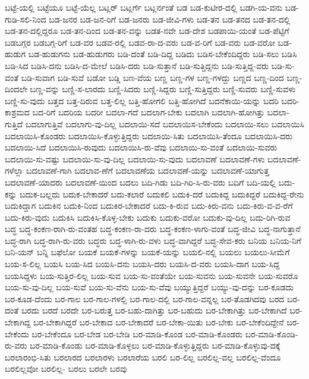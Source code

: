 {ಬಟ್ಟೆ-ಯಲ್ಲಿ
ಬಟ್ಟೆಯೂ
ಬಟ್ಟೆ-ಯೆಲ್ಲ
ಬಟ್ಲರ್
ಬಟ್ಲರ್ಗೆ
ಬಟ್ಲರ್ನಂತೆ
ಬಡ
ಬಡ-ಕುಟೀರ-ದಲ್ಲಿ
ಬಡಗಿ-ಯ-ವನು
ಬಡ-ಗುಡಿ-ಸಲಿ-ನಿಂದ
ಬಡ-ಜನರ
ಬಡ-ಜನ-ರಿಗೆ
ಬಡ-ಜನರು
ಬಡ-ಜೀವಿ-ಗಳು
ಬಡ-ತನ
ಬಡ-ತನದ
ಬಡ-ತನ-ದಲ್ಲಿ
ಬಡ-ತನ-ದಲ್ಲಿದ್ದರೂ
ಬಡ-ತನ-ದಿಂದ
ಬಡ-ತನ-ವನ್ನು
ಬಡತ-ನವೇ
ಬಡ-ದೇಶ
ಬಡಪಾಯಿ-ಯಂತೆ
ಬಡ-ಪೆಟ್ಟಿಗೆ
ಬಡಬಗ್ಗರ
ಬಡಬಗ್ಗ-ರಿಗೆ
ಬಡ-ವರ
ಬಡವ-ರಲ್ಲಿ
ಬಡವ-ರಾ-ದ-ವರು
ಬಡ-ವ-ರಿಗೆ
ಬಡ-ವರು
ಬಡ-ವರೋ
ಬಡ-ಹುಡುಗ
ಬಡ-ಹುಡುಗನು
ಬಡ-ಹುಡುಗರು
ಬಡಿ-ದಂತೆ
ಬಡಿ-ದಿದ್ದ
ಬಡಿದು
ಬಡಿಸ-ಬೇಕೆಂದಿದ್ದರು
ಬಡಿ-ಸಲು
ಬಡಿಸಿ
ಬಡಿ-ಸಿದ
ಬಡಿಸಿ-ದನು
ಬಡಿಸಿ-ದ-ಮೇಲೆ
ಬಡಿಸಿ-ದರು
ಬಡಿ-ಸುತ್ತಾನೆ
ಬಡಿ-ಸುತ್ತಿದ್ದನು
ಬಡಿ-ಸುತ್ತಿದ್ದ-ವರು
ಬಡಿ-ಸು-ವಂತೆ
ಬಡಿ-ಸುವಾಗ
ಬಡಿ-ಸುವೆ
ಬಡೋ
ಬಡ್ಡಿ
ಬಣ-ವೆಯ
ಬಣ್ಣ
ಬಣ್ಣ-ಗಳ
ಬಣ್ಣ-ಗಳದ್ದು
ಬಣ್ಣದ
ಬಣ್ಣ-ದಿಂದ
ಬಣ್ಣ-ದಿಂದಲೇ
ಬಣ್ಣ-ವನ್ನು
ಬಣ್ಣಿ-ಸ-ಲಾರದು
ಬಣ್ಣಿ-ಸಿದರು
ಬಣ್ಣಿ-ಸಿದ್ದರು
ಬಣ್ಣಿ-ಸುತ್ತಿದ್ದರು
ಬಣ್ಣಿ-ಸುವರು
ಬಣ್ಣಿ-ಸುವಳು
ಬಣ್ಣಿ-ಸು-ವುದು
ಬತ್ತದ
ಬತ್ತ-ದಿರುವ
ಬತ್ತ-ಲಿಲ್ಲ
ಬತ್ತಿ-ಹೋಗಲಿ
ಬತ್ತಿ-ಹೋಗಿದೆ
ಬದನೆಕಾಯಿ-ಯನ್ನು
ಬದರಿ
ಬದರಿ-ಕಾಶ್ರಮದ
ಬದ-ರಿಗೆ
ಬದರಿಯ
ಬದರೀ
ಬದಲಾ-ಗದೆ
ಬದಲಾಗ-ಬೇಕು
ಬದಲಾಗಿ
ಬದಲಾಗಿ-ಹೋಗಿತ್ತು
ಬದಲಾ-ಗುತ್ತಿದೆ
ಬದಲಾಗುತ್ತಿವೆ
ಬದಲಾಗು-ವು-ದಿಲ್ಲ
ಬದಲಾಯಿ-ಸದೆ
ಬದಲಾಯಿಸ-ಬೇಕೆಂದು
ಬದಲಾಯಿ-ಸಲು
ಬದಲಾಯಿಸಿ
ಬದಲಾಯಿಸಿ-ಕೊಂಡರು
ಬದಲಾಯಿಸಿ-ಕೊಳ್ಳುತ್ತಿದ್ದರು
ಬದಲಾಯಿ-ಸಿತು
ಬದಲಾಯಿಸಿ-ತೆಂದೂ
ಬದಲಾಯಿಸಿ-ದರು
ಬದಲಾಯಿ-ಸಿದೆ
ಬದಲಾಯಿಸಿ-ರುವುದು
ಬದಲಾಯಿಸಿ-ರು-ವೆವು
ಬದಲಾಯಿ-ಸು-ವಂತೆ
ಬದಲಾಯಿ-ಸುವರು
ಬದಲಾಯಿ-ಸು-ವಷ್ಟು
ಬದಲಾಯಿ-ಸು-ವು-ದಿಲ್ಲ
ಬದಲಾಯಿ-ಸು-ವುದು
ಬದಲಾವಣೆ
ಬದಲಾವಣೆ-ಗಳು
ಬದಲಾವಣೆ-ಗಳೆಲ್ಲಾ
ಬದಲಾವಣೆ-ಗಾಗಿ
ಬದಲಾವ-ಣೆಗೆ
ಬದಲಾವಣೆಯ
ಬದಲಾವಣೆ-ಯನ್ನು
ಬದಲಾವಣೆ-ಯಾಗುತ್ತ
ಬದಲಾವಣೆ-ಯಾದರು
ಬದಲಾವಣೆ-ಯಿಂದ
ಬದಲು
ಬದಿ-ಗಿಡು
ಬದಿ-ಗಿರಿ-ಸಿ-ರು-ವರು
ಬದಿಗೆ
ಬದಿ-ಯಲ್ಲಿ
ಬದು-ಕನ್ನು
ಬದುಕ-ಬಲ್ಲದು
ಬದುಕ-ಬೇಕಾದರೆ
ಬದು-ಕಲಾರೆ
ಬದುಕಲಿ
ಬದುಕಿ-ದರೆ
ಬದುಕಿದ್ದ
ಬದುಕಿದ್ದರೆ
ಬದುಕಿದ್ದ-ರೇನು
ಬದುಕಿದ್ದಾಗ
ಬದುಕಿನ
ಬದುಕಿ-ನಿಂದ
ಬದುಕಿರ-ಬೇಕಾದರೆ
ಬದು-ಕಿ-ರುವ
ಬದು-ಕಿರು-ವನು
ಬದು-ಕಿರು-ವ-ವ-ರೆಗೆ
ಬದು-ಕಿರು-ವುದು
ಬದುಕಿಸಿ
ಬದುಕಿಸಿ-ಕೊಳ್ಳ-ಬೇಕು
ಬದುಕು
ಬದುಕು-ವರೋ
ಬದುಕು-ವು-ದಿಲ್ಲ
ಬದು-ರಿಗಿ-ರುವ
ಬದ್ಧ
ಬದ್ಧ-ಕಂಕಣ-ರಾಗಿ-ರು-ವಂತಹ
ಬದ್ಧ-ಕಂಕಣ-ರಾ-ದರು
ಬದ್ಧ-ಕಂಕಣ-ಳಾಗು-ವಂತೆ
ಬದ್ಧ-ಜೀವಿ
ಬದ್ಧ-ನಾಗುತ್ತಾನೆ
ಬದ್ಧ-ರಾಗಿ
ಬದ್ಧ-ರಾಗಿ-ರು-ವರು
ಬದ್ಧರು
ಬದ್ಧ-ಳಾಗಿ-ರು-ವಳು
ಬದ್ಧ-ವಾಗಿದ್ದರೆ
ಬದ್ಧ-ಸೇವ-ಕರು
ಬನಿಯ
ಬನಿಯ-ನಿಗೆ
ಬನಿ-ಯನ್
ಬನ್ನಿ
ಬಫೆಲೋ
ಬಯಕೆ
ಬಯಕೆ-ಗಳನ್ನು
ಬಯಕೆ-ಯನ್ನು
ಬಯಲಿ-ನಲ್ಲಿ
ಬಯಲು
ಬಯಲು-ಸೀಮೆಗೆ
ಬಯ-ಸ-ಲಿಲ್ಲ
ಬಯಸಿ
ಬಯ-ಸಿದ
ಬಯಸಿ-ದನು
ಬಯಸಿ-ದರು
ಬಯಸಿ-ದ-ವರು
ಬಯಸಿ-ದಾಗ
ಬಯ-ಸಿದ್ದ
ಬಯಸಿದ್ದಳು
ಬಯ-ಸುತ್ತಿರ-ಲಿಲ್ಲ
ಬಯ-ಸುವ
ಬಯ-ಸು-ವಂತೆಯೇ
ಬಯ-ಸುವನು
ಬಯ-ಸುವನೇ
ಬಯ-ಸುವರೊ
ಬಯ-ಸು-ವು-ದಿಲ್ಲ
ಬಯ-ಸುವೆ
ಬಯ-ಸು-ವೆನು
ಬಯ-ಸು-ವೆವು
ಬಯ್ಯುತ್ತಿದ್ದರೆ
ಬಯ್ಯು-ವು-ದನ್ನು
ಬರ-ಕೂಡದು
ಬರ-ಕೂಡ-ದೆಂದು
ಬರ-ಗಾಲ
ಬರ-ಗಾಲ-ಗಳಲ್ಲಿ
ಬರ-ಗಾಲ-ದಲ್ಲಿ
ಬರ-ಗಾಲ-ವನ್ನಲ್ಲ
ಬರ-ತೊಡಗಿದವು
ಬರದ
ಬರ-ದಂತೆ
ಬರದು
ಬರದೆ
ಬರದೇ
ಬರ-ಬರುತ್ತ
ಬರ-ಬಹು-ದಾಗಿತ್ತು
ಬರ-ಬಹುದು
ಬರ-ಬೇಕಾಗಿತ್ತು
ಬರ-ಬೇಕಾಗಿದೆ
ಬರ-ಬೇಕಾಗಿದ್ದ
ಬರ-ಬೇಕಾಗಿದ್ದರೆ
ಬರ-ಬೇಕಾದ
ಬರ-ಬೇಕಾದರೆ
ಬರ-ಬೇಕಾ-ಯಿತು
ಬರ-ಬೇಕು
ಬರ-ಬೇಕೆಂದಿದ್ದೇನೆ
ಬರ-ಬೇಕೆಂದು
ಬರ-ಬೇಕೆಂದೂ
ಬರ-ಬೇಡ
ಬರ-ಬೇಡಿ
ಬರ-ಮಾಡಿ-ಕೊಂಡ
ಬರ-ಮಾಡಿ-ಕೊಂಡರು
ಬರ-ಮಾಡಿ-ಕೊಂಡಿ-ರು-ವರು
ಬರ-ಮಾಡಿ-ಕೊಂಡು
ಬರ-ಮಾಡಿ-ಕೊಳ್ಳಲು
ಬರ-ಮಾಡಿ-ಕೊಳ್ಳುತ್ತಿದ್ದರು
ಬರ-ಮಾಡಿ-ಕೊಳ್ಳುವು-ದಕ್ಕೆ
ಬರಲಾರಂಭಿ-ಸಿತು
ಬರಲಾರದ
ಬರಲಾರಳು
ಬರಲಾರೆಯ
ಬರಲಿ
ಬರ-ಲಿಲ್ಲ
ಬರಲಿಲ್ಲ-ವಲ್ಲ
ಬರಲಿಲ್ಲ-ವೆಂದೂ
ಬರಲಿಲ್ಲವೋ
ಬರಲಿಲ್ಲ-
ಬರಲು
ಬರಲೇ
ಬರವು
}
